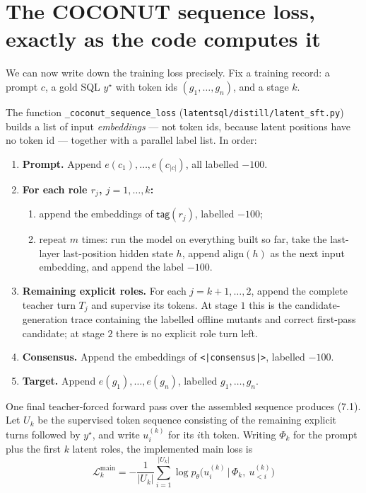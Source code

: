 \documentclass[11pt]{article}
\theoremstyle{definition}
\begin{document}
\begin{center}
\end{center}

\section{The COCONUT sequence loss, exactly as the code computes it}

We can now write down the training loss precisely. Fix a training record: a prompt $c$, a gold SQL $y^\star$ with token ids $(g_1,\dots,g_n)$, and a stage $k$.

The function \texttt{\_coconut\_sequence\_loss} (\texttt{latentsql/distill/latent\_sft.py}) builds a list of input \emph{embeddings} --- not token ids, because latent positions have no token id --- together with a parallel label list. In order:

\begin{enumerate}
\item \textbf{Prompt.} Append $e(c_1),\dots,e(c_{|c|})$, all labelled $-100$.
\item \textbf{For each role $r_j$, $j=1,\dots,k$:}
  \begin{enumerate}
\item append the embeddings of $\textsf{tag}(r_j)$, labelled $-100$;
\item repeat $m$ times: run the model on everything built so far, take the last-layer last-position hidden state $h$, append $\mathrm{align}(h)$ as the next input embedding, and append the label $-100$.
  \end{enumerate}
\item \textbf{Remaining explicit roles.} For each $j=k+1,\dots,2$, append the complete teacher turn $T_j$ and supervise its tokens. At stage $1$ this is the candidate-generation trace containing the labelled offline mutants and correct first-pass candidate; at stage $2$ there is no explicit role turn left.
\item \textbf{Consensus.} Append the embeddings of \texttt{<|consensus|>}, labelled $-100$.
\item \textbf{Target.} Append $e(g_1),\dots,e(g_n)$, labelled $g_1,\dots,g_n$.
\end{enumerate}

One final teacher-forced forward pass over the assembled sequence produces (7.1). Let $U_k$ be the supervised token sequence consisting of the remaining explicit turns followed by $y^\star$, and write $u^{(k)}_i$ for its $i$th token. Writing $\Phi_k$ for the prompt plus the first $k$ latent roles, the implemented main loss is
\[
\boxed{\
\mathcal{L}^{\mathrm{main}}_k
= -\frac{1}{|U_k|}\sum_{i=1}^{|U_k|}\log p_\theta\big(u^{(k)}_i \,\big|\, \Phi_k,\ u^{(k)}_{<i}\big)
\ }
\tag{7.2}
\]
\end{document}
